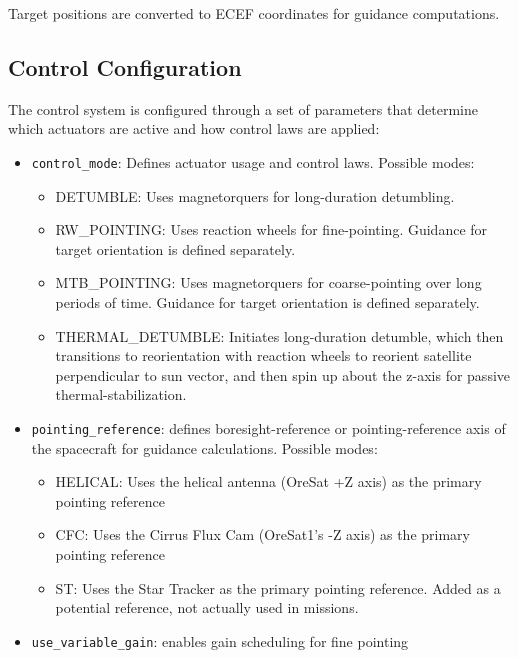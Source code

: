 Target positions are converted to ECEF coordinates for guidance computations.

\subsection{Control Configuration}

The control system is configured through a set of parameters that determine which actuators are active and how control laws are applied:

\begin{itemize}[itemsep=6pt]
	\item \texttt{control\_mode}: Defines actuator usage and control laws. Possible modes:
	\begin{itemize}
		\item DETUMBLE: Uses magnetorquers for long-duration detumbling.
		\item RW\_POINTING: Uses reaction wheels for fine-pointing. Guidance for target orientation is defined separately.
		\item MTB\_POINTING: Uses magnetorquers for coarse-pointing over long periods of time. Guidance for target orientation is defined separately.
		\item THERMAL\_DETUMBLE: Initiates long-duration detumble, which then transitions to reorientation with reaction wheels to reorient satellite perpendicular to sun vector, and then spin up about the z-axis for passive thermal-stabilization.
	\end{itemize}
	
	\item \texttt{pointing\_reference}: defines boresight-reference or pointing-reference axis of the spacecraft for guidance calculations. Possible modes:
	\begin{itemize}
		\item HELICAL: Uses the helical antenna (OreSat +Z axis) as the primary pointing reference
		\item CFC: Uses the Cirrus Flux Cam (OreSat1's -Z axis) as the primary pointing reference
		\item ST: Uses the Star Tracker as the primary pointing reference. Added as a potential reference, not actually used in missions.
	\end{itemize}
	\item \texttt{use\_variable\_gain}: enables gain scheduling for fine pointing
\end{itemize}


